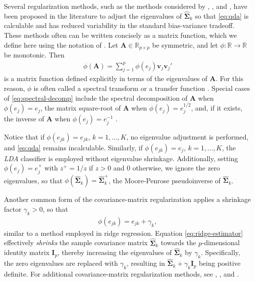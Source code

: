 \documentclass[11pt]{article}
\begin{document}
Several regularization methods, such as the methods considered by \citet*{Guo:2007te}, \cite{Mkhadri:1995jp}, and \citet*{Xu:2009fl}, have been proposed in the literature to adjust the eigenvalues of $\widehat{\bm \Sigma}_k$ so that \eqref{eq:qda} is calculable and has reduced variability in the standard bias-variance tradeoff. These methods often can be written concisely as a matrix function, which we define here using the notation of \cite{Izenman:2008gm}. Let $\bm A \in \mathbb{R}_{p \times p}$ be symmetric, and let $\phi:\mathbb{R} \rightarrow \mathbb{R}$ be monotonic. Then
\begin{align}
	\phi(\bm A) = \sum_{j = 1}^p \phi(e_j) \bm v_j \bm v_j'\label{eq:spectral-decomp}
\end{align}
is a matrix function defined explicitly in terms of the eigenvalues of $\bm A$. For this reason, $\phi$ is often called a spectral transform \citep*{Zhu:2010vu} or a transfer function \citep{Ye:2009gd}. Special cases of \eqref{eq:spectral-decomp} include the spectral decomposition of $\bm A$ when $\phi(e_j) = e_j$, the matrix square-root of $\bm A$ when $\phi(e_j) = e_j^{1/2}$, and, if it exists, the inverse of $\bm A$ when $\phi(e_j) = e_j^{-1}$ \citep{Harville:2008wja}.

Notice that if  $\phi(e_{jk}) = e_{jk}$, $k = 1, \ldots, K$, no eigenvalue adjustment is performed, and \eqref{eq:qda} remains incalculable. Similarly, if $\phi(e_{jk}) = e_{j}$, $k = 1, \ldots, K$, the \emph{LDA} classifier is employed without eigenvalue shrinkage. Additionally, setting $\phi(e_j) = e_j^{+}$ with $z^{+} = 1/z$ if $z > 0$ and $0$ otherwise, we ignore the zero eigenvalues, so that $\phi(\widehat{\bm \Sigma}_k) = \widehat{\bm \Sigma}_k^{+}$, the Moore-Penrose pseudoinverse of $\widehat{\bm \Sigma}_k$.

Another common form of the covariance-matrix regularization applies a shrinkage factor $\gamma_k > 0$, so that
\begin{align}
	\phi(e_{jk}) = e_{jk} + \gamma_k, \label{eq:ridge-estimator}
\end{align}
similar to a method employed in ridge regression. Equation \eqref{eq:ridge-estimator} effectively \emph{shrinks} the sample covariance matrix $\widehat{\bm\Sigma}_k$ towards the $p$-dimensional identity matrix $\bm I_p$, thereby increasing the eigenvalues of $\widehat{\bm\Sigma}_k$ by $\gamma_k$. Specifically, the zero eigenvalues are replaced with $\gamma_k$, resulting in $\widehat{\bm \Sigma}_k + \gamma_k \bm I_p$ being positive definite. For additional covariance-matrix regularization methods, see \cite{Ramey:2011ji}, \cite{Xu:2009fl}, and \cite{Ye:2009gd}.
\end{document}

